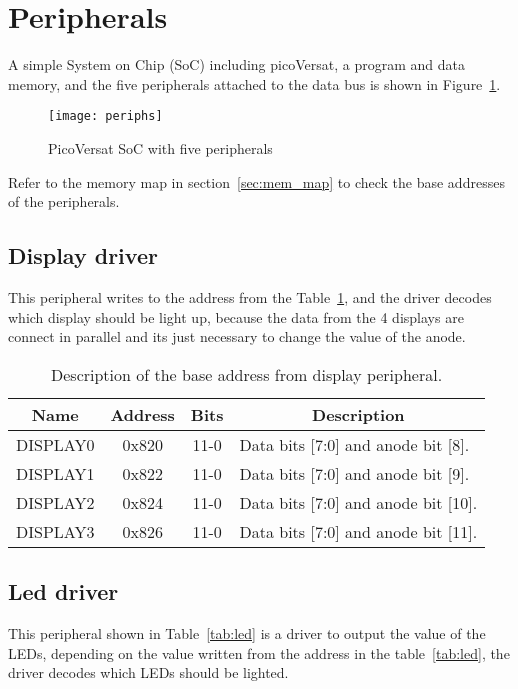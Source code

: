 \section{Peripherals}
\label{sec:periphs}

A simple System on Chip (SoC) including picoVersat, a program and data memory, and the five peripherals
attached to the data bus is shown in Figure~\ref{fig:periphs}.

\begin{figure}[!htbp]
    \centerline{\texttt{[image: periphs]}}
    \vspace{0cm}\caption{PicoVersat SoC with five peripherals}
    \label{fig:periphs}
\end{figure}

Refer to the memory map in section~\ref{sec:mem_map} to check the base addresses
of the peripherals.

\subsection{Display driver}
This peripheral writes to the address from the Table~\ref{tab:display}, and the driver decodes which display should be light up, because the data from the 4 displays are connect in parallel and its just necessary to change the value of the anode.

\begin{table}[h]
\centering
\begin{tabular}{|l|c|c|l|}
\hline
\multicolumn{1}{|c|}{\bf Name} & {\bf Address} & {\bf Bits} & \multicolumn{1}{c|}{\bf Description} \\ 
\hline \hline
\multicolumn{1}{|l|}{DISPLAY0} & 0x820 & 11-0 & Data bits [7:0] and anode bit [8].\\ 
\hline
\multicolumn{1}{|l|}{DISPLAY1} & 0x822 & 11-0 & Data bits [7:0] and anode bit [9].\\ 
\hline
\multicolumn{1}{|l|}{DISPLAY2} & 0x824 & 11-0 & Data bits [7:0] and anode bit [10].\\ 
\hline
\multicolumn{1}{|l|}{DISPLAY3} & 0x826 & 11-0 & Data bits [7:0] and anode bit [11].\\ 
\hline
\end{tabular}
\caption{Description of the base address from display peripheral.}
\label{tab:display}
\end{table}

\subsection{Led driver}
This peripheral shown in Table~\ref{tab:led} is a driver to output the value of the LEDs, depending on the value written from the address in the table~\ref{tab:led}, the driver decodes which LEDs should be lighted.


